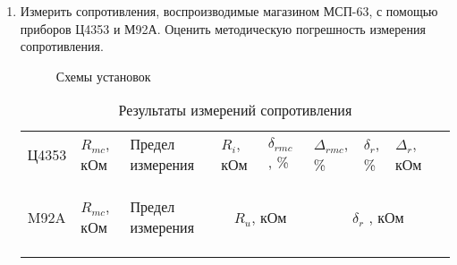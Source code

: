 \begin{enumerate}
\clearpage

\item
Измерить сопротивления, воспроизводимые магазином МСП-63, с помощью приборов Ц4353 и М92А. Оценить методическую погрешность измерения сопротивления.


\begin{figure}[h]
  \begin{minipage}[h]{0.4\linewidth}
  \end{minipage}
  \hfill
  \begin{minipage}[h]{0.4\linewidth}
  \end{minipage}
  \caption{Схемы установок}
\end{figure}

\vspace{4mm}

\begin{table} [htbp]
  \centering
  \begin{tabular}{| p{1cm} | p{2cm} | p{2cm} | p{2cm} | p{1.5cm} | p{1.5cm} | p{1.5cm} | p{2cm}l |}
  \hline
  \centering Ц4353 &\centering $ R_{mc} $, кОм &\centering Предел измерения &\centering $ R_{i} $, кОм &\centering $ \delta_{rmc} $ , \%  &\centering $ \Delta_{rmc} $, \% &\centering $ \delta_{r} $, \% &\centering $ \Delta_{r} $, кОм &\\ \cline{2-9}
  &\centering &\centering &\centering &\centering &\centering &\centering &\centering &\\ \cline{2-9}
  &\centering &\centering &\centering &\centering &\centering &\centering &\centering &\\ \cline{2-9}
  &\centering &\centering &\centering &\centering &\centering &\centering &\centering &\\ \cline{2-9}
  \hline
  \centering M92A &\centering $ R_{mc} $, кОм &\centering Предел измерения & \multicolumn{2}{c|}{ $ R_{u} $, кОм } & \multicolumn{4}{c|}{ $\delta_{r}$ , кОм } \\ \cline{2-9}
  &\centering &\centering &\multicolumn{2}{c|}{} & \multicolumn{4}{c|}{ } \\ \cline{2-9}
  &\centering &\centering &\multicolumn{2}{c|}{} & \multicolumn{4}{c|}{ } \\ \cline{2-9}
  &\centering &\centering &\multicolumn{2}{c|}{} & \multicolumn{4}{c|}{ } \\ \cline{2-9}
  \hline
  \end{tabular}
  \caption{Результаты измерений сопротивления}
\end{table}


\end{enumerate}
